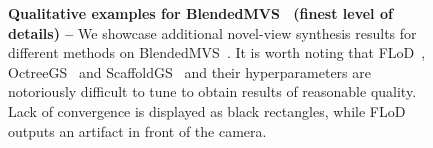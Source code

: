 \begin{figure}[t]
  \centering
  \supprecblendedmvs
  \caption[Qualitative examples for BlendedMVS~\cite{yao2020blendedmvs}]{
    \textbf{Qualitative examples for BlendedMVS~\cite{yao2020blendedmvs} (finest level of details) --}
    We showcase additional novel-view synthesis results for different methods on
    BlendedMVS~\cite{yao2020blendedmvs}.
    It is worth noting that FLoD~\cite{seo2024flod}, OctreeGS~\cite{ren2024octree}
    and ScaffoldGS~\cite{lu2024scaffold} and their hyperparameters are notoriously
    difficult to tune to obtain results of reasonable quality.
    Lack of convergence is displayed as black rectangles, while FLoD outputs an
    artifact in front of the camera.
  }
  \label{fig:clog-supp-qualitative-rec-blendedmvs}
\end{figure}